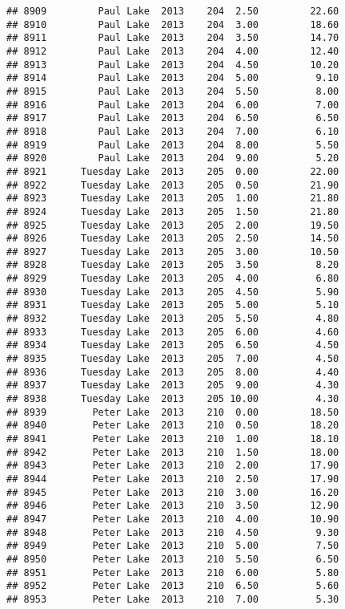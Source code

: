 \documentclass[
]{article}
\begin{document}
\begin{verbatim}
## 8909         Paul Lake  2013    204  2.50         22.60
## 8910         Paul Lake  2013    204  3.00         18.60
## 8911         Paul Lake  2013    204  3.50         14.70
## 8912         Paul Lake  2013    204  4.00         12.40
## 8913         Paul Lake  2013    204  4.50         10.20
## 8914         Paul Lake  2013    204  5.00          9.10
## 8915         Paul Lake  2013    204  5.50          8.00
## 8916         Paul Lake  2013    204  6.00          7.00
## 8917         Paul Lake  2013    204  6.50          6.50
## 8918         Paul Lake  2013    204  7.00          6.10
## 8919         Paul Lake  2013    204  8.00          5.50
## 8920         Paul Lake  2013    204  9.00          5.20
## 8921      Tuesday Lake  2013    205  0.00         22.00
## 8922      Tuesday Lake  2013    205  0.50         21.90
## 8923      Tuesday Lake  2013    205  1.00         21.80
## 8924      Tuesday Lake  2013    205  1.50         21.80
## 8925      Tuesday Lake  2013    205  2.00         19.50
## 8926      Tuesday Lake  2013    205  2.50         14.50
## 8927      Tuesday Lake  2013    205  3.00         10.50
## 8928      Tuesday Lake  2013    205  3.50          8.20
## 8929      Tuesday Lake  2013    205  4.00          6.80
## 8930      Tuesday Lake  2013    205  4.50          5.90
## 8931      Tuesday Lake  2013    205  5.00          5.10
## 8932      Tuesday Lake  2013    205  5.50          4.80
## 8933      Tuesday Lake  2013    205  6.00          4.60
## 8934      Tuesday Lake  2013    205  6.50          4.50
## 8935      Tuesday Lake  2013    205  7.00          4.50
## 8936      Tuesday Lake  2013    205  8.00          4.40
## 8937      Tuesday Lake  2013    205  9.00          4.30
## 8938      Tuesday Lake  2013    205 10.00          4.30
## 8939        Peter Lake  2013    210  0.00         18.50
## 8940        Peter Lake  2013    210  0.50         18.20
## 8941        Peter Lake  2013    210  1.00         18.10
## 8942        Peter Lake  2013    210  1.50         18.00
## 8943        Peter Lake  2013    210  2.00         17.90
## 8944        Peter Lake  2013    210  2.50         17.90
## 8945        Peter Lake  2013    210  3.00         16.20
## 8946        Peter Lake  2013    210  3.50         12.90
## 8947        Peter Lake  2013    210  4.00         10.90
## 8948        Peter Lake  2013    210  4.50          9.30
## 8949        Peter Lake  2013    210  5.00          7.50
## 8950        Peter Lake  2013    210  5.50          6.50
## 8951        Peter Lake  2013    210  6.00          5.80
## 8952        Peter Lake  2013    210  6.50          5.60
## 8953        Peter Lake  2013    210  7.00          5.30

\end{verbatim}
\end{document}
